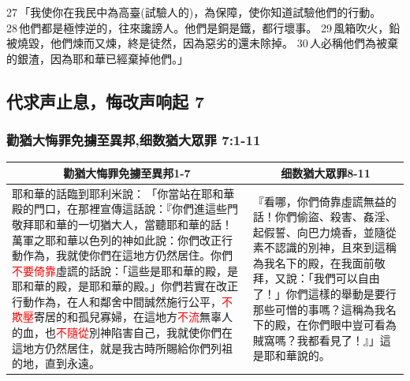 27 「我使你在我民中為高臺(試驗人的)，為保障，使你知道試驗他們的行動。 28 他們都是極悖逆的，往來讒謗人。他們是銅是鐵，都行壞事。 29 風箱吹火，鉛被燒毀，他們煉而又煉，終是徒然，因為惡劣的還未除掉。 30 人必稱他們為被棄的銀渣，因為耶和華已經棄掉他們。」



\subsection{代求声止息，悔改声响起 7}
\subsubsection{勸猶大悔罪免擄至異邦,细数猶大眾罪 7:1-11}
\begin{table}[H]
\centering
\begin{tabular}{p{10.75cm}|p{6.50cm}}\hline\hline
\multicolumn{1}{c|}{勸猶大悔罪免擄至異邦1-7}&\multicolumn{1}{c}{细数猶大眾罪8-11}\\\hline
耶和華的話臨到耶利米說： 「你當站在耶和華殿的門口，在那裡宣傳這話說：『你們進這些門敬拜耶和華的一切猶大人，當聽耶和華的話！萬軍之耶和華以色列的神如此說：你們改正行動作為，我就使你們在這地方仍然居住。你們\textcolor{red}{不要倚靠}虛謊的話說：「這些是耶和華的殿，是耶和華的殿，是耶和華的殿。」你們若實在改正行動作為，在人和鄰舍中間誠然施行公平，\textcolor{red}{不欺壓}寄居的和孤兒寡婦，在這地方\textcolor{red}{不流}無辜人的血，也\textcolor{red}{不隨從}別神陷害自己，我就使你們在這地方仍然居住，就是我古時所賜給你們列祖的地，直到永遠。
&『看哪，你們倚靠虛謊無益的話！你們偷盜、殺害、姦淫、起假誓、向巴力燒香，並隨從素不認識的別神，且來到這稱為我名下的殿，在我面前敬拜，又說：「我們可以自由了！」你們這樣的舉動是要行那些可憎的事嗎？這稱為我名下的殿，在你們眼中豈可看為賊窩嗎？我都看見了！』」這是耶和華說的。\\\hline
\end{tabular}
\end{table}

 
